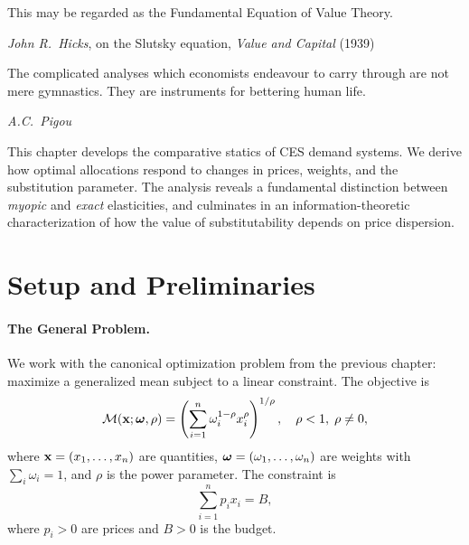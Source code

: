 
\epigraph{This may be regarded as the Fundamental Equation of Value Theory.}{\textit{John R.\ Hicks}, on the Slutsky equation, \textit{Value and Capital} (1939)}

\epigraph{The complicated analyses which economists endeavour to carry through are not mere gymnastics. They are instruments for bettering human life.}{\textit{A.C.\ Pigou}}
This chapter develops the comparative statics of CES demand systems. We derive how optimal allocations respond to changes in prices, weights, and the substitution parameter. The analysis reveals a fundamental distinction between \emph{myopic} and \emph{exact} elasticities, and culminates in an information-theoretic characterization of how the value of substitutability depends on price dispersion.

\section{Setup and Preliminaries}
\label{sec:cs-setup}

\paragraph{The General Problem.}

We work with the canonical optimization problem from the previous chapter: maximize a generalized mean subject to a linear constraint. The objective is
\begin{equation}
\label{eq:cs-objective}
\mathcal{M}(\mathbf{x}; \boldsymbol{\omega}, \rho) = \left( \sum_{i=1}^{n} \omega_i^{1-\rho} x_i^{\rho} \right)^{1/\rho}, \quad \rho < 1, \; \rho \neq 0,
\end{equation}
where $\mathbf{x} = (x_1, \ldots, x_n)$ are quantities, $\boldsymbol{\omega} = (\omega_1, \ldots, \omega_n)$ are weights with $\sum_i \omega_i = 1$, and $\rho$ is the power parameter. The constraint is
\begin{equation}
\label{eq:cs-constraint}
\sum_{i=1}^{n} p_i x_i = B,
\end{equation}
where $p_i > 0$ are prices and $B > 0$ is the budget.

